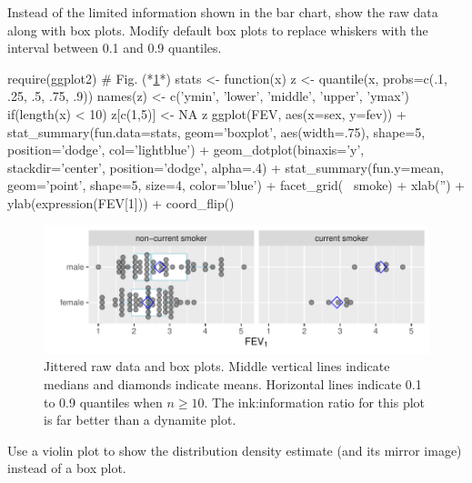 Instead of the limited information shown in the bar chart, show the
raw data along with box plots.  Modify default box plots to replace
whiskers with the interval between 0.1 and 0.9 quantiles.
\begin{Schunk}
\begin{Sinput}
require(ggplot2)   # Fig. (*\ref{fig:descript-tplot}*)
stats <- function(x) {
  z <- quantile(x, probs=c(.1, .25, .5, .75, .9))
  names(z) <- c('ymin', 'lower', 'middle', 'upper', 'ymax')
  if(length(x) < 10) z[c(1,5)] <- NA
  z
}
ggplot(FEV, aes(x=sex, y=fev)) +
  stat_summary(fun.data=stats, geom='boxplot', aes(width=.75), shape=5,
               position='dodge', col='lightblue') +
  geom_dotplot(binaxis='y', stackdir='center', position='dodge', alpha=.4) +
  stat_summary(fun.y=mean, geom='point', shape=5, size=4, color='blue') +
  facet_grid(~ smoke) +
  xlab('') + ylab(expression(FEV[1])) + coord_flip()
\end{Sinput}
\begin{figure}[htbp]

\centerline{\includegraphics[width=\maxwidth]{descript-tplot-1} }

\caption[Dot plot with superimposed box plots]{Jittered raw data and box plots.  Middle vertical lines indicate medians and diamonds indicate means. Horizontal lines indicate 0.1 to 0.9 quantiles when $n\geq 10$.  The ink:information ratio for this plot is far better than a dynamite plot.}\label{fig:descript-tplot}
\end{figure}
\end{Schunk}
Use a violin plot to show the distribution density estimate (and its
mirror image) instead of a box plot.
